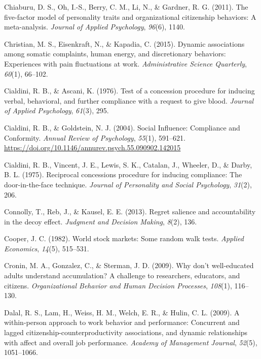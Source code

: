 \documentclass[english,,man]{apa6}
\begin{document}
\leavevmode\hypertarget{ref-chiaburu_five-factor_2011}{}%
Chiaburu, D. S., Oh, I.-S., Berry, C. M., Li, N., \& Gardner, R. G. (2011). The five-factor model of personality traits and organizational citizenship behaviors: A meta-analysis. \emph{Journal of Applied Psychology}, \emph{96}(6), 1140.

\leavevmode\hypertarget{ref-christian_dynamic_2015}{}%
Christian, M. S., Eisenkraft, N., \& Kapadia, C. (2015). Dynamic associations among somatic complaints, human energy, and discretionary behaviors: Experiences with pain fluctuations at work. \emph{Administrative Science Quarterly}, \emph{60}(1), 66--102.

\leavevmode\hypertarget{ref-cialdini_test_1976}{}%
Cialdini, R. B., \& Ascani, K. (1976). Test of a concession procedure for inducing verbal, behavioral, and further compliance with a request to give blood. \emph{Journal of Applied Psychology}, \emph{61}(3), 295.

\leavevmode\hypertarget{ref-cialdini_social_2004}{}%
Cialdini, R. B., \& Goldstein, N. J. (2004). Social Influence: Compliance and Conformity. \emph{Annual Review of Psychology}, \emph{55}(1), 591--621. \url{https://doi.org/10.1146/annurev.psych.55.090902.142015}

\leavevmode\hypertarget{ref-cialdini_reciprocal_1975}{}%
Cialdini, R. B., Vincent, J. E., Lewis, S. K., Catalan, J., Wheeler, D., \& Darby, B. L. (1975). Reciprocal concessions procedure for inducing compliance: The door-in-the-face technique. \emph{Journal of Personality and Social Psychology}, \emph{31}(2), 206.

\leavevmode\hypertarget{ref-connolly_regret_2013}{}%
Connolly, T., Reb, J., \& Kausel, E. E. (2013). Regret salience and accountability in the decoy effect. \emph{Judgment and Decision Making}, \emph{8}(2), 136.

\leavevmode\hypertarget{ref-cooper_world_1982}{}%
Cooper, J. C. (1982). World stock markets: Some random walk tests. \emph{Applied Economics}, \emph{14}(5), 515--531.

\leavevmode\hypertarget{ref-cronin_why_2009}{}%
Cronin, M. A., Gonzalez, C., \& Sterman, J. D. (2009). Why don't well-educated adults understand accumulation? A challenge to researchers, educators, and citizens. \emph{Organizational Behavior and Human Decision Processes}, \emph{108}(1), 116--130.

\leavevmode\hypertarget{ref-dalal_within-person_2009}{}%
Dalal, R. S., Lam, H., Weiss, H. M., Welch, E. R., \& Hulin, C. L. (2009). A within-person approach to work behavior and performance: Concurrent and lagged citizenship-counterproductivity associations, and dynamic relationships with affect and overall job performance. \emph{Academy of Management Journal}, \emph{52}(5), 1051--1066.
\end{document}
